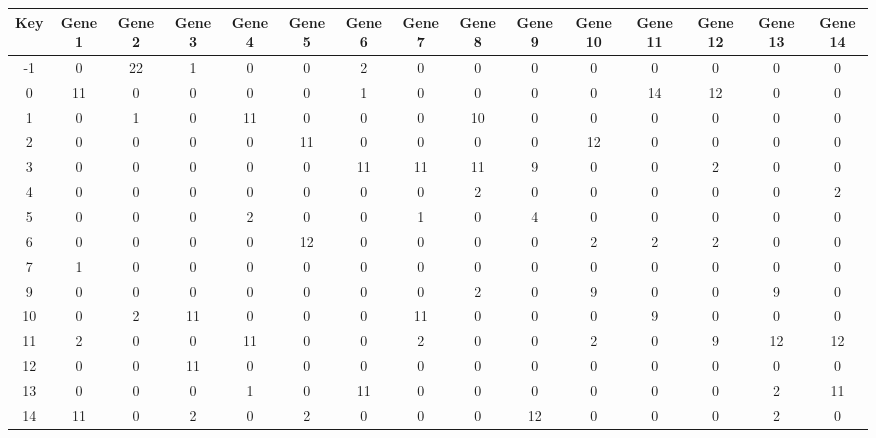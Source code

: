 \begin{tabular}{|c|c|c|c|c|c|c|c|c|c|c|c|c|c|c|}
\hline
Key & Gene 1 & Gene 2 & Gene 3 & Gene 4 & Gene 5 & Gene 6 & Gene 7 & Gene 8 & Gene 9 & Gene 10 & Gene 11 & Gene 12 & Gene 13 & Gene 14 \\
\hline
-1 & 0 & 22 & 1 & 0 & 0 & 2 & 0 & 0 & 0 & 0 & 0 & 0 & 0 & 0 \\
0 & 11 & 0 & 0 & 0 & 0 & 1 & 0 & 0 & 0 & 0 & 14 & 12 & 0 & 0 \\
1 & 0 & 1 & 0 & 11 & 0 & 0 & 0 & 10 & 0 & 0 & 0 & 0 & 0 & 0 \\
2 & 0 & 0 & 0 & 0 & 11 & 0 & 0 & 0 & 0 & 12 & 0 & 0 & 0 & 0 \\
3 & 0 & 0 & 0 & 0 & 0 & 11 & 11 & 11 & 9 & 0 & 0 & 2 & 0 & 0 \\
4 & 0 & 0 & 0 & 0 & 0 & 0 & 0 & 2 & 0 & 0 & 0 & 0 & 0 & 2 \\
5 & 0 & 0 & 0 & 2 & 0 & 0 & 1 & 0 & 4 & 0 & 0 & 0 & 0 & 0 \\
6 & 0 & 0 & 0 & 0 & 12 & 0 & 0 & 0 & 0 & 2 & 2 & 2 & 0 & 0 \\
7 & 1 & 0 & 0 & 0 & 0 & 0 & 0 & 0 & 0 & 0 & 0 & 0 & 0 & 0 \\
9 & 0 & 0 & 0 & 0 & 0 & 0 & 0 & 2 & 0 & 9 & 0 & 0 & 9 & 0 \\
10 & 0 & 2 & 11 & 0 & 0 & 0 & 11 & 0 & 0 & 0 & 9 & 0 & 0 & 0 \\
11 & 2 & 0 & 0 & 11 & 0 & 0 & 2 & 0 & 0 & 2 & 0 & 9 & 12 & 12 \\
12 & 0 & 0 & 11 & 0 & 0 & 0 & 0 & 0 & 0 & 0 & 0 & 0 & 0 & 0 \\
13 & 0 & 0 & 0 & 1 & 0 & 11 & 0 & 0 & 0 & 0 & 0 & 0 & 2 & 11 \\
14 & 11 & 0 & 2 & 0 & 2 & 0 & 0 & 0 & 12 & 0 & 0 & 0 & 2 & 0 \\
\hline
\end{tabular}